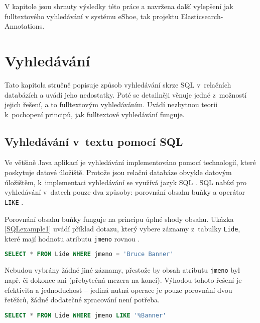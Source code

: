 \documentclass[11pt,oneside]{fithesis2}
\begin{document}
V kapitole \textit{} jsou shrnuty výsledky této práce a navržena další vylepšení jak fulltextového vyhledávání v systému eShoe, tak projektu Elasticsearch-Annotations.

\chapter{Vyhledávání}
\label{VyhledavaniChapter}
Tato kapitola stručně popisuje způsob vyhledávání skrze SQL v~relačních databázích a uvádí jeho nedostatky. Poté se detailněji věnuje jedné z~možností jejich řešení, a to fulltextovým vyhledáváním. Uvádí nezbytnou teorii k~pochopení principů, jak fulltextové vyhledávání funguje.

\section{Vyhledávání v~textu pomocí SQL}
\label{SQLsection}
Ve většině Java aplikací je vyhledávání implementováno pomocí technologií, které poskytuje datové úložiště. Protože jsou relační databáze obvykle datovým úložištěm, k~implementaci vyhledávání se využívá jazyk SQL \cite{HibernateSearchAction}. SQL nabízí pro vyhledávání v~datech pouze dva způsoby: porovnání obsahu buňky a operátor \texttt{LIKE} \cite{MistrovstviMySQL}.

Porovnání obsahu buňky funguje na principu úplné shody obsahu. Ukázka \ref{SQLexample1} uvádí příklad dotazu, který vybere záznamy z~tabulky \texttt{Lide}, které mají hodnotu atributu \texttt{jmeno} rovnou . 

\begin{lstlisting}[language=SQL, caption =  Jednoduché použití SQL pro vyhledávání pomocí úplné shody obsahu pole, label = SQLexample1]
SELECT * FROM Lide WHERE jmeno = 'Bruce Banner'
\end{lstlisting}

Nebudou vybrány žádné jiné záznamy, přestože by obsah atributu \texttt{jmeno} byl např.  či dokonce ani  (přebytečná mezera na konci). Výhodou tohoto řešení je efektivita a jednoduchost -- jediná nutná operace je 
pouze porovnání dvou řetěžců, žádné dodatečné zpracování není potřeba. 

\begin{lstlisting}[language=SQL, caption =  Použití SQL operátoru LIKE, label = SQLexample2]
SELECT * FROM Lide WHERE jmeno LIKE '%Banner'
\end{lstlisting}
\end{document}
